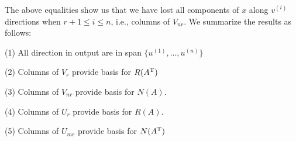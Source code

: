 The above equalities show us that we have lost all components of $x$ along $v^{(i)}$ directions when $r+1 \leq i \leq n$, i.e., columns of $V_{nr}$. We summarize the results as follows:

(1) All direction in output are in span $\{u^{(1)} ,..., u^{(n)}\}$

(2) Columns of $V_{r}$ provide basis for $R(A^{{\rm T}})$

(3) Columns of $V_{nr}$ provide basis for $N(A)$.

(4) Columns of $U_r$ provide basis for $R(A)$.

(5) Columns of $U_{mr}$ provide basis for $N(A^{{\rm T}})$








